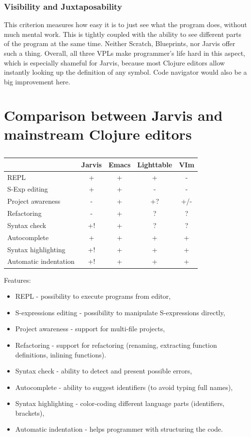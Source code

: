 \documentclass[11pt]{scrartcl}
\begin{document}
\subsubsection{Visibility and Juxtaposability}
This criterion measures how easy it is to just see what the program does, without much mental work. This is tightly coupled with the ability to see different parts of the program at the same time.
Neither Scratch, Blueprints, nor Jarvis offer such a thing. Overall, all three VPLs make programmer’s life hard in this aspect, which is especially shameful for Jarvis, because most Clojure editors allow instantly looking up the definition of any symbol. Code navigator would also be a big improvement here.

\section{Comparison between Jarvis and mainstream Clojure editors}
\begin{table}[hbt]
  \begin{tabular}{l|cccc}
    & Jarvis & Emacs & Lighttable & VIm \\
    \hline
    REPL & + & + & + & - \\
    S-Exp editing & + & + & - & - \\
    Project awareness & - & + & +? & +/- \\
    Refactoring & - & + & ? & ? \\
    Syntax check & +! & + & ? & ? \\
    Autocomplete & + & + & + & + \\
    Syntax highlighting & +! & + & + & + \\
    Automatic indentation & +! & + & + & + \\
  \end{tabular}
  \caption{}
\end{table}
Features:
\begin{itemize}
  \item REPL - possibility to execute programs from editor,
  \item S-expressions editing - possibility to manipulate S-expressions directly,
  \item Project awareness - support for multi-file projects,
  \item Refactoring - support for refactoring (renaming, extracting function definitions, inlining functions).
  \item Syntax check - ability to detect and present possible errors,
  \item Autocomplete - ability to suggest identifiers (to avoid typing full names),
  \item Syntax highlighting - color-coding different language parts (identifiers, brackets),
  \item Automatic indentation - helps programmer with structuring the code.
\end{itemize}
\end{document}
